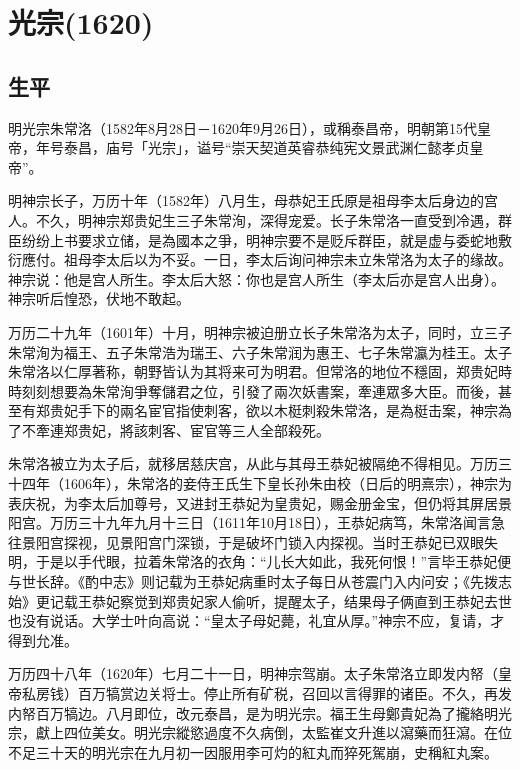 
\section{光宗\tiny(1620)}

\subsection{生平}

明光宗朱常洛（1582年8月28日－1620年9月26日），或稱泰昌帝，明朝第15代皇帝，年号泰昌，庙号「光宗」，谥号“崇天契道英睿恭纯宪文景武渊仁懿孝贞皇帝”。

明神宗长子，万历十年（1582年）八月生，母恭妃王氏原是祖母李太后身边的宫人。不久，明神宗郑贵妃生三子朱常洵，深得宠爱。长子朱常洛一直受到冷遇，群臣纷纷上书要求立储，是為國本之爭，明神宗要不是贬斥群臣，就是虚与委蛇地敷衍應付。祖母李太后以为不妥。一日，李太后询问神宗未立朱常洛为太子的缘故。神宗说：他是宫人所生。李太后大怒：你也是宫人所生（李太后亦是宫人出身）。神宗听后惶恐，伏地不敢起。

万历二十九年（1601年）十月，明神宗被迫册立长子朱常洛为太子，同时，立三子朱常洵为福王、五子朱常浩为瑞王、六子朱常润为惠王、七子朱常瀛为桂王。太子朱常洛以仁厚著称，朝野皆认为其将来可为明君。但常洛的地位不穩固，郑贵妃時時刻刻想要為朱常洵爭奪儲君之位，引發了兩次妖書案，牽連眾多大臣。而後，甚至有郑贵妃手下的兩名宦官指使刺客，欲以木梃刺殺朱常洛，是為梃击案，神宗為了不牽連郑贵妃，將該刺客、宦官等三人全部殺死。

朱常洛被立为太子后，就移居慈庆宫，从此与其母王恭妃被隔绝不得相见。万历三十四年（1606年），朱常洛的妾侍王氏生下皇长孙朱由校（日后的明熹宗），神宗为表庆祝，为李太后加尊号，又进封王恭妃为皇贵妃，赐金册金宝，但仍将其屏居景阳宫。万历三十九年九月十三日（1611年10月18日），王恭妃病笃，朱常洛闻言急往景阳宫探视，见景阳宫门深锁，于是破坏门锁入内探视。当时王恭妃已双眼失明，于是以手代眼，拉着朱常洛的衣角：“儿长大如此，我死何恨！”言毕王恭妃便与世长辞。《酌中志》则记载为王恭妃病重时太子每日从苍震门入内问安；《先拨志始》更记载王恭妃察觉到郑贵妃家人偷听，提醒太子，结果母子俩直到王恭妃去世也没有说话。大学士叶向高说：“皇太子母妃薨，礼宜从厚。”神宗不应，复请，才得到允准。

万历四十八年（1620年）七月二十一日，明神宗驾崩。太子朱常洛立即发内帑（皇帝私房钱）百万犒赏边关将士。停止所有矿税，召回以言得罪的诸臣。不久，再发内帑百万犒边。八月即位，改元泰昌，是为明光宗。福王生母鄭貴妃為了攏絡明光宗，獻上四位美女。明光宗縱慾過度不久病倒，太監崔文升進以瀉藥而狂瀉。在位不足三十天的明光宗在九月初一因服用李可灼的紅丸而猝死駕崩，史稱紅丸案。


